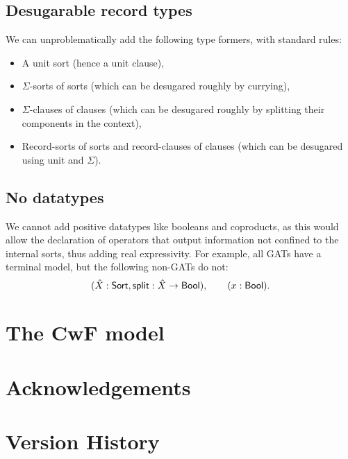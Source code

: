 \documentclass[a4paper]{article}
\begin{document}
\subsection{Desugarable record types}
We can unproblematically add the following type formers, with standard rules:
\begin{itemize}[noitemsep]
	\item A unit sort (hence a unit clause),
	\item $\Sigma$-sorts of sorts (which can be desugared roughly by currying),
	\item $\Sigma$-clauses of clauses (which can be desugared roughly by splitting their components in the context),
	\item Record-sorts of sorts and record-clauses of clauses (which can be desugared using unit and $\Sigma$).
\end{itemize}

\subsection{No datatypes}
We cannot add positive datatypes like booleans and coproducts, as this would allow the declaration of operators that output information not confined to the internal sorts, thus adding real expressivity. For example, all GATs have a terminal model, but the following non-GATs do not:
\[
	(\hat X : {\mathsf{Sort}}, \mathsf{split} : \hat X \to {\mathsf{Bool}}), \qquad
	(x : {\mathsf{Bool}}).
\]

\section{The CwF model}

\section*{Acknowledgements}

\appendix
\section{Version History}



\end{document}
